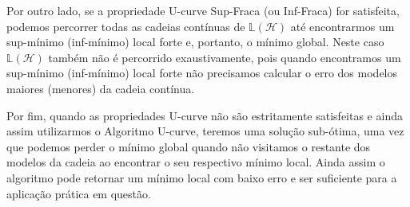Por outro lado, se a propriedade U-curve Sup-Fraca (ou Inf-Fraca) for satisfeita, podemos percorrer todas as cadeias contínuas de $\mathbb{L} \left( \mathcal{H} \right) $ até encontrarmos um sup-mínimo (inf-mínimo) local forte e, portanto, o mínimo global. Neste caso $\mathbb{L} \left( \mathcal{H} \right) $ também não é percorrido exaustivamente, pois quando encontramos um sup-mínimo (inf-mínimo) local forte não precisamos calcular o erro dos modelos maiores (menores) da cadeia contínua.

Por fim, quando as propriedades U-curve não são estritamente satisfeitas e ainda assim utilizarmos o Algoritmo U-curve, teremos uma solução sub-ótima, uma vez que podemos perder o mínimo global quando não visitamos o restante dos modelos da cadeia ao encontrar o seu respectivo mínimo local. Ainda assim o algoritmo pode retornar um mínimo local com baixo erro e ser suficiente para a aplicação prática em questão.